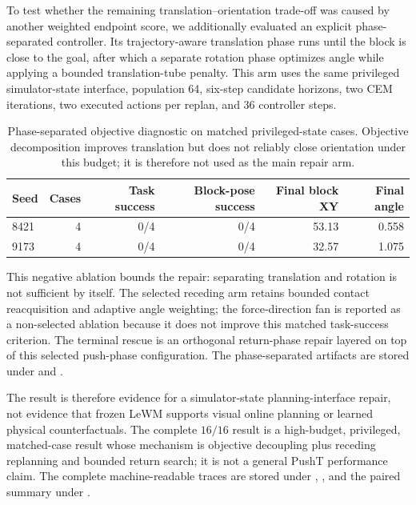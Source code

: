 \documentclass{article}
\begin{document}
To test whether the remaining translation--orientation trade-off was caused
by another weighted endpoint score, we additionally evaluated an explicit
phase-separated controller.  Its trajectory-aware translation phase runs
until the block is close to the goal, after which a separate rotation phase
optimizes angle while applying a bounded translation-tube penalty.  This arm
uses the same privileged simulator-state interface, population 64, six-step
candidate horizons, two CEM iterations, two executed actions per replan, and
36 controller steps.

\begin{table}[H]
\centering
\scriptsize
\setlength{\tabcolsep}{4pt}
\caption{Phase-separated objective diagnostic on matched privileged-state
cases.  Objective decomposition improves translation but does not reliably
close orientation under this budget; it is therefore not used as the main
repair arm.}
\label{tab:supp-phase-separated-diagnostic}
\begin{tabular}{lrrrrr}
\toprule
Seed & Cases & Task success & Block-pose success & Final block XY & Final angle \\
\midrule
8421 & 4 & 0/4 & 0/4 & 53.13 & 0.558 \\
9173 & 4 & 0/4 & 0/4 & 32.57 & 1.075 \\
\bottomrule
\end{tabular}
\end{table}

This negative ablation bounds the repair: separating translation and rotation
is not sufficient by itself.  The selected receding arm retains bounded
contact reacquisition and adaptive angle weighting; the force-direction fan is
reported as a non-selected ablation because it does not improve this matched
task-success criterion.  The terminal rescue is an orthogonal return-phase
repair layered on top of this selected push-phase configuration.  The
phase-separated artifacts are stored under
 and
.

The result is therefore evidence for a simulator-state planning-interface
repair, not evidence that frozen LeWM supports visual online planning or
learned physical counterfactuals.  The complete $16/16$ result is a
high-budget, privileged, matched-case result whose mechanism is objective
decoupling plus receding replanning and bounded return search; it is not a
general PushT performance claim.  The complete machine-readable traces are
stored under
,
,
and the paired summary under
.
\end{document}

